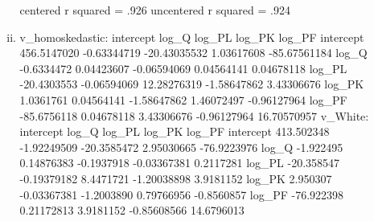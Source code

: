 \documentclass{article}
\begin{document}
\begin{enumerate}
\begin{enumerate}[i)]
				
				centered r squared = .926 \newline
				uncentered r squared = .924 \newline
				
				\item  v\_homoskedastic: \newline
				              intercept       log\_Q       log\_PL      log\_PK       log\_PF \newline
				            intercept 456.5147020 -0.63344719 -20.43035532  1.03617608 -85.67561184 \newline
				            log\_Q      -0.6334472  0.04423607  -0.06594069  0.04564141   0.04678118 \newline
				            log\_PL    -20.4303553 -0.06594069  12.28276319 -1.58647862   3.43306676 \newline
				            log\_PK      1.0361761  0.04564141  -1.58647862  1.46072497  -0.96127964 \newline
				            log\_PF    -85.6756118  0.04678118   3.43306676 -0.96127964  16.70570957 \newline
				            \newline
				       v\_White: \newline
				                  intercept       log\_Q      log\_PL      log\_PK      log\_PF \newline
				                  intercept 413.502348 -1.92249509 -20.3585472  2.95030665 -76.9223976 \newline
				                  log\_Q      -1.922495  0.14876383  -0.1937918 -0.03367381   0.2117281 \newline
				                  log\_PL    -20.358547 -0.19379182   8.4471721 -1.20038898   3.9181152 \newline
				                  log\_PK      2.950307 -0.03367381  -1.2003890  0.79766956  -0.8560857 \newline
				                  log\_PF    -76.922398  0.21172813   3.9181152 -0.85608566  14.6796013 \newline
				                  \newline
				      

\end{enumerate}
\end{enumerate}
\end{document}
